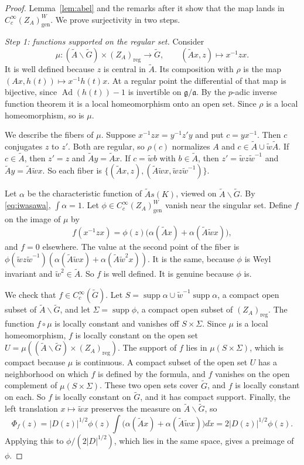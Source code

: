 \documentclass[12pt,letterpaper]{article}
\numberwithin{equation}{section}
\theoremstyle{plain}
\theoremstyle{definition}
\theoremstyle{remark}
\newcommand{\Gt}{\widetilde G}
\newcommand{\At}{\widetilde A}
\newcommand{\wt}{\tilde w}
\newcommand{\ZA}{Z_A}
\newcommand{\gen}{\mathrm{gen}}
\newcommand{\reg}{\mathrm{reg}}
\DeclareMathOperator{\Ad}{Ad}
\begin{document}
\begin{proof}
Lemma~\ref{lem:abel} and the remarks after it show that the map lands
in $C_c^\infty(\ZA)_\gen^W$. We prove surjectivity in two steps.

\emph{Step 1: functions supported on the regular set.} Consider
\[
\mu:(\At\backslash\Gt)\times(\ZA)_\reg\to\Gt,\qquad
(\At x,z)\mapsto x^{-1}zx .
\]
It is well defined because $z$ is central in $\At$. Its composition
with $\rho$ is the map $(Ax,h(t))\mapsto x^{-1}h(t)x$. At a regular
point the differential of that map is bijective, since
$\Ad(h(t))-1$ is invertible on $\mathfrak g/\mathfrak a$. By the
$p$-adic inverse function theorem it is a local homeomorphism onto an
open set. Since $\rho$ is a local homeomorphism, so is $\mu$.

We describe the fibers of $\mu$. Suppose $x^{-1}zx=y^{-1}z'y$ and put
$c=yx^{-1}$. Then $c$ conjugates $z$ to $z'$. Both are regular, so
$\rho(c)$ normalizes $A$ and $c\in\At\cup\wt\At$. If $c\in\At$, then
$z'=z$ and $\At y=\At x$. If $c=\wt b$ with $b\in\At$, then
$z'=\wt z\wt^{-1}$ and $\At y=\At\wt x$. So each fiber is
$\{(\At x,z),(\At\wt x,\wt z\wt^{-1})\}$.

Let $\alpha$ be the characteristic function of $\At s(K)$, viewed on
$\At\backslash\Gt$. By \eqref{eq:iwasawa}, $\int\alpha=1$. Let
$\phi\in C_c^\infty(\ZA)_\gen^W$ vanish near the singular set. Define
$f$ on the image of $\mu$ by
\[
f(x^{-1}zx)=\phi(z)\bigl(\alpha(\At x)+\alpha(\At\wt x)\bigr),
\]
and $f=0$ elsewhere. The value at the second point of the fiber is
$\phi(\wt z\wt^{-1})(\alpha(\At\wt x)+\alpha(\At\wt^2x))$. It is the
same, because $\phi$ is Weyl invariant and $\wt^2\in\At$. So $f$ is well
defined. It is genuine because $\phi$ is.

We check that $f\in C_c^\infty(\Gt)$. Let
$S=\operatorname{supp}\alpha\cup\wt^{-1}\operatorname{supp}\alpha$, a
compact open subset of $\At\backslash\Gt$, and let
$\Sigma=\operatorname{supp}\phi$, a compact open subset of $(\ZA)_\reg$.
The function $f\circ\mu$ is locally constant and vanishes off
$S\times\Sigma$. Since $\mu$ is a local homeomorphism, $f$ is locally
constant on the open set $U=\mu((\At\backslash\Gt)\times(\ZA)_\reg)$.
The support of $f$ lies in $\mu(S\times\Sigma)$, which is compact
because $\mu$ is continuous. A compact subset of the open set $U$ has a
neighborhood on which $f$ is defined by the formula, and $f$ vanishes
on the open complement of $\mu(S\times\Sigma)$. These two open sets
cover $\Gt$, and $f$ is locally constant on each. So $f$ is locally
constant on $\Gt$, and it has compact support. Finally, the
left translation $x\mapsto\wt x$ preserves the measure on
$\At\backslash\Gt$, so
\[
\Phi_f(z)=|D(z)|^{1/2}\phi(z)\int\bigl(\alpha(\At x)+\alpha(\At\wt x)
\bigr)d\dot x=2|D(z)|^{1/2}\phi(z).
\]
Applying this to $\phi/(2|D|^{1/2})$, which lies in the same space,
gives a preimage of $\phi$.


\end{proof}
\end{document}
